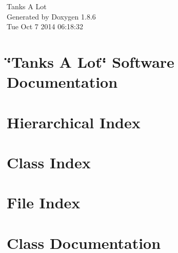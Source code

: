 \documentclass[twoside]{book}
\newcommand{\clearemptydoublepage}{%
  \newpage{\pagestyle{empty}\cleardoublepage}%
}
\begin{document}
\hypersetup{pageanchor=false}
\begin{titlepage}
\vspace*{7cm}
\begin{center}%
{\Large Tanks A Lot }\\
\vspace*{1cm}
{\large Generated by Doxygen 1.8.6}\\
\vspace*{0.5cm}
{\small Tue Oct 7 2014 06:18:32}\\
\end{center}
\end{titlepage}
\clearemptydoublepage
\tableofcontents
\clearemptydoublepage
{}
\hypersetup{pageanchor=true}

\chapter{\char`\"{}\-Tanks A Lot\char`\"{} Software Documentation}
\label{index}\hypertarget{index}{}
\chapter{Hierarchical Index}

\chapter{Class Index}

\chapter{File Index}

\chapter{Class Documentation}










































\end{document}
